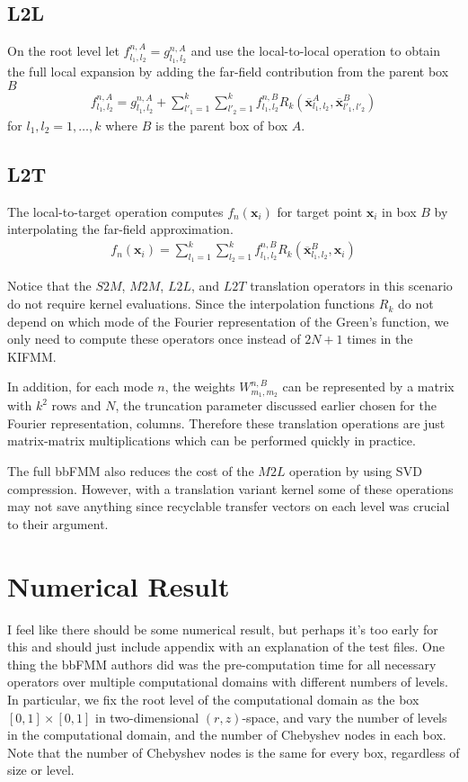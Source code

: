 \documentclass[11pt, oneside]{article}   	%
\begin{document}
\subsection{L2L}
On the root level let $f^{n,A}_{l_1,l_2}=g^{n,A}_{l_1,l_2}$ and use the local-to-local operation to obtain the full local expansion by adding the far-field contribution from the parent box $B$
\begin{align}
f^{n,A}_{l_1,l_2}=g^{n,A}_{l_1,l_2} + \sum_{l'_1=1}^k \sum_{l'_2=1}^k f^{n,B}_{l_1,l_2} R_k(\mathbf{\overline{x}}_{l_1,l_2}^A,\mathbf{\overline{x}}_{l'_1,l'_2}^B)
\end{align}
for $l_1,l_2 = 1,\dots,k$ where $B$ is the parent box of box $A$.
\subsection{L2T}
The local-to-target operation computes $f_n(\mathbf{x}_i)$ for target point $\mathbf{x}_i$ in box $B$ by interpolating the far-field approximation.
\begin{align}
f_n(\mathbf{x}_i)=\sum_{l_1=1}^k \sum_{l_2=1}^kf^{n,B}_{l_1,l_2} R_k(\mathbf{\overline{x}}_{l_1,l_2}^B,\mathbf{x}_i)
\end{align}

Notice that the $S2M$, $M2M$, $L2L$, and $L2T$ translation operators in this scenario do not require kernel evaluations. Since the interpolation functions $R_k$ do not depend on which mode of the Fourier representation of the Green's function, we only need to compute these operators once instead of $2N+1$ times in the KIFMM.

In addition, for each mode $n$, the weights $W^{n,B}_{m_1,m_2}$ can be represented by a matrix with $k^2$ rows and $N$, the truncation parameter discussed earlier chosen for the Fourier representation, columns. Therefore these translation operations are just matrix-matrix multiplications which can be performed quickly in practice.

The full bbFMM also reduces the cost of the $M2L$ operation by using SVD compression. However, with a translation variant kernel some of these operations may not save anything since recyclable transfer vectors on each level was crucial to their argument.

\section{Numerical Result}
I feel like there should be some numerical result, but perhaps it's too early for this and should just include appendix with an explanation of the test files. One thing the bbFMM authors did was the pre-computation time for all necessary operators over multiple computational domains with different numbers of levels. In particular, we fix the root level of the computational domain as the box $[0,1]\times[0,1]$ in two-dimensional $(r,z)$-space, and vary the number of levels in the computational domain, and the number of Chebyshev nodes in each box. Note that the number of Chebyshev nodes is the same for every box, regardless of size or level.
\end{document}
